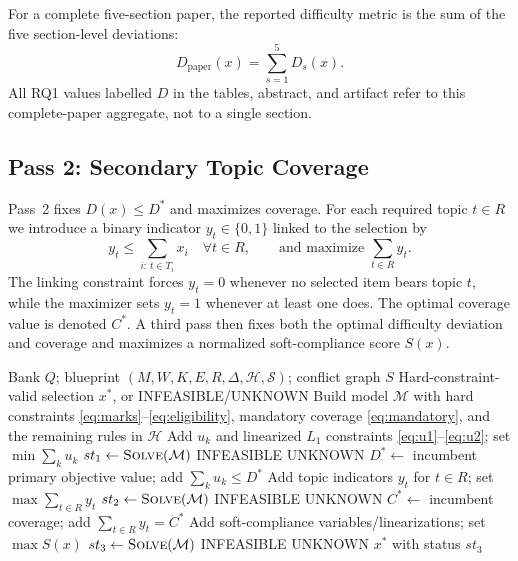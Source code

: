 \documentclass[runningheads]{llncs}
\begin{document}
For a complete five-section paper, the reported difficulty metric is the sum of the five section-level deviations:
\begin{equation}
D_{\mathrm{paper}}(x)=\sum_{s=1}^{5}D_s(x).
\label{eq:paperD}
\end{equation}
All RQ1 values labelled $D$ in the tables, abstract, and artifact refer to this complete-paper aggregate, not to a single section.

\subsection{Pass 2: Secondary Topic Coverage}
Pass~2 fixes $D(x)\le D^\ast$ and maximizes coverage.
For each required topic $t\in R$ we introduce a binary indicator $y_t\in\{0,1\}$ linked to the selection by
\begin{equation}
y_t \le \sum_{i:\,t\in T_i} x_i \quad \forall t\in R,\qquad \text{and maximize } \sum_{t\in R} y_t.
\end{equation}
The linking constraint forces $y_t=0$ whenever no selected item bears topic $t$, while the maximizer sets $y_t=1$ whenever at least one does.
The optimal coverage value is denoted $C^*$. A third pass then fixes both the optimal difficulty deviation and coverage and maximizes a normalized soft-compliance score $S(x)$.

\begin{algorithm}[t]
\caption{Three-pass lexicographic CP-SAT solver ($B1$)}
\label{alg:threepass}
\begin{algorithmic}[1]
\Require Bank $Q$; blueprint $(M,W,K,E,R,\Delta,\mathcal{H},\mathcal{S})$; conflict graph $S$
\Ensure Hard-constraint-valid selection $x^*$, or INFEASIBLE/UNKNOWN
\State Build model $\mathcal{M}$ with hard constraints \eqref{eq:marks}--\eqref{eq:eligibility}, mandatory coverage \eqref{eq:mandatory}, and the remaining rules in $\mathcal{H}$
\State Add $u_k$ and linearized $L_1$ constraints \eqref{eq:u1}--\eqref{eq:u2}; set $\min\sum_k u_k$
\State $st_1\gets\textsc{Solve}(\mathcal{M})$
 \State \Return INFEASIBLE \EndIf
{} \State \Return UNKNOWN \EndIf
{}
\State $D^*\gets$ incumbent primary objective value; add $\sum_k u_k\le D^*$
\State Add topic indicators $y_t$ for $t\in R$; set $\max\sum_{t\in R}y_t$
\State $st_2\gets\textsc{Solve}(\mathcal{M})$
 \State \Return INFEASIBLE \EndIf
{} \State \Return UNKNOWN \EndIf
{}
\State $C^*\gets$ incumbent coverage; add $\sum_{t\in R}y_t=C^*$
\State Add soft-compliance variables/linearizations; set $\max S(x)$
\State $st_3\gets\textsc{Solve}(\mathcal{M})$
 \State \Return INFEASIBLE \EndIf
{} \State \Return UNKNOWN \EndIf
{}
\State \Return $x^*$ with status $st_3$
\end{algorithmic}
\end{algorithm}
\end{document}
